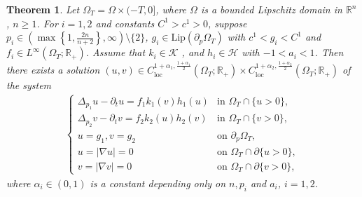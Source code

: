 \documentclass[11pt,oneside,english]{amsart}
\newcommand{\R}{{\mathbb R}}
\newcommand{\cK}{{\mathcal K}}
\newcommand{\cH}{{\mathcal H}}
\newcommand{\al}{\alpha}
\newcommand{\loc}{\operatorname{loc}}
\newcommand{\D}{\nabla}
\numberwithin{equation}{section}
\newtheorem{theorem}{Theorem}
\theoremstyle{plain}
\numberwithin{equation}{section}
\begin{document}
\begin{theorem}
    \label{thm:p-par}
    Let $\Omega_T = \Omega \times (-T,0]$, where 
    $\Omega$ is a bounded Lipschitz  domain in $\R^n$, $n\ge1 $. For $i=1,2$ and constants $C^1>c^1>0$, suppose $p_i\in\left(\max\left\{1,\frac{2n}{n+2}\right\},\infty \right)\setminus\{2\}$,
    $g_i\in \text{Lip}(\partial_p\Omega_T)$ with $c^1<g_i<C^1$ and $f_i\in L^\infty(\Omega_T;\R_+)$. Assume that $k_i\in \cK$ , and $h_i\in \cH$ with $-1<a_i<1$. Then there exists a solution $(u,v)\in C^{1+\al_1,\frac{1+\al_1}2}_{\loc}(\Omega_T;\R_+)\times C^{1+\al_2,\frac{1+\al_2}2}_{\loc}(\Omega_T;\R_+)$ of the system
    \begin{align}\label{sys:p-par}
        \begin{cases}
            \Delta_{p_1} u - \partial_t u= f_1k_1(v)h_1(u)&\text{in }\Omega_T\cap\{u>0\},\\
           \Delta_{p_2} v - \partial_t v =f_2k_2(u)h_2(v)&\text{in }\Omega_T\cap\{v>0\},\\
            u=g_1,v=g_2&\text{on }\partial_p\Omega_T,\\
            u=|\D u|=0&\text{on }\Omega_T\cap\partial\{u>0\},\\
            v=|\D v|=0&\text{on }\Omega_T\cap\partial\{v>0\},
        \end{cases}
    \end{align}
    where $\al_i\in(0,1)$ is a constant depending only on $n,p_i$ and $a_i$, $i=1,2$.
\end{theorem}
\end{document}
